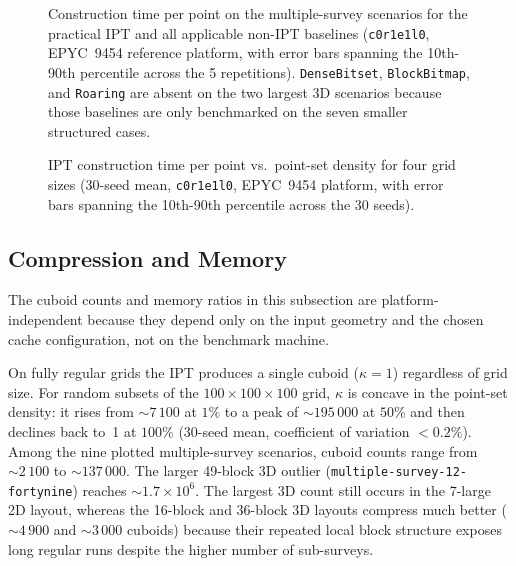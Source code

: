 \documentclass[manuscript,screen,review]{acmart}
\theoremstyle{definition}
\theoremstyle{plain}
\begin{document}
\begin{figure}
\centering
\resizebox{0.96\linewidth}{!}{}
\caption{Construction time per point on the multiple-survey
  scenarios for the practical IPT and all applicable non-IPT baselines
  (\texttt{c0r1e1l0}, EPYC~9454 reference platform, with error bars
  spanning the 10th-90th percentile across the 5 repetitions).
  \texttt{DenseBitset}, \texttt{BlockBitmap}, and \texttt{Roaring} are
  absent on the two largest 3D scenarios because those baselines are
  only benchmarked on the seven smaller structured cases.}
\label{figure:construct-multi-survey}
\end{figure}

\begin{figure}
\centering

\caption{IPT construction time per point vs.\ point-set density
  for four grid sizes (30-seed mean, \texttt{c0r1e1l0},
  EPYC~9454 platform, with error bars spanning the 10th-90th percentile across
  the 30 seeds).}
\label{figure:construct-vs-density}
\end{figure}

\subsection{Compression and Memory}
\label{section:results-kappa}

The cuboid counts and memory ratios in this subsection are
platform-independent because they depend only on the input geometry and
the chosen cache configuration, not on the benchmark machine.

On fully regular grids the IPT produces a single cuboid ($\kappa = 1$)
regardless of grid size.
For random subsets of the $100{\times}100{\times}100$ grid, $\kappa$ is concave in the
point-set density: it rises from ${\sim}7\,100$ at $1\%$ to a peak of
${\sim}195\,000$ at $50\%$ and then declines back to~1 at $100\%$
(30-seed mean, coefficient of variation $< 0.2\%$).
Among the nine plotted multiple-survey scenarios, cuboid counts range
from $\sim\!2\,100$ to $\sim\!137\,000$. The larger 49-block 3D
outlier (\texttt{multiple-survey-12-fortynine}) reaches
$\sim\!1.7\!\times\!10^{6}$.
The largest 3D count still occurs in the 7-large 2D layout, whereas the
16-block and 36-block 3D layouts compress much better
($\sim\!4\,900$ and $\sim\!3\,000$ cuboids) because their repeated local
block structure exposes long regular runs despite the higher number of
sub-surveys.
\end{document}
